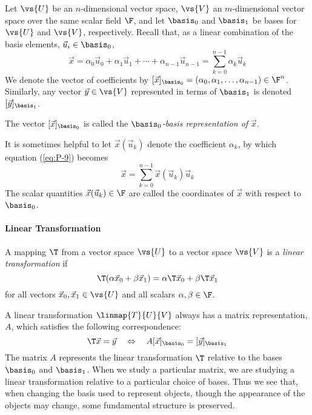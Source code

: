 Let $\vs{U}$ be an $n$-dimensional vector space,
$\vs{V}$ an $m$-dimensional vector space over the same scalar field $\F$, and
let $\basis_0$ and $\basis_1$ be bases for $\vs{U}$ and $\vs{V}$,
respectively. Recall that, %
as a linear combination of the basis elements, $\vec{u}_i \in \basis_0$,
\begin{equation}\label{eq:P-9}
\vec{x} = \alpha_0 \vec{u}_0 + \alpha_1 \vec{u}_1 + \cdots + \alpha_{n-1}\vec{u}_{n-1} =
\sum_{k=0}^{n-1}\alpha_k \vec{u}_k 
\end{equation}
We denote the vector of coefficients by 
$[\vec{x}]_{\basis_0} = (\alpha_0 , \alpha_1 , \ldots ,\alpha_{n-1})\in \F^n$.  
Similarly, any vector $\vec{y} \in \vs{V}$ represented in terms of $\basis_1$ is
denoted $[\vec{y}]_{\basis_1}$. 
\begin{definition}
The vector $[\vec{x}]_{\basis_0}$ is called the
\emph{$\basis_0$-basis representation of $\vec{x}$}.
\end{definition}
It is sometimes helpful to let $\vec{x}(\vec{u}_k)$ denote the coefficient $\alpha_k$,
by which equation (\ref{eq:P-9}) becomes  
\[
\vec{x} %
= \sum_{k=0}^{n-1}\vec{x}(\vec{u}_k)\vec{u}_k
\]
The scalar quantities $\vec{x}(\vec{u}_k)\in \F$ are called
the coordinates of $\vec{x}$ with respect to $\basis_0$.

\paragraph{Linear Transformation}
\begin{definition}
A mapping $\T$ from a vector space $\vs{U}$ to a vector space $\vs{V}$ %
is a {\it linear transformation} %
if 
\begin{equation}\label{eq:P-10}
\T(\alpha \vec{x}_0 + \beta \vec{x}_1) = \alpha \T \vec{x}_0 + \beta \T \vec{x}_1
\end{equation} 
for all vectors $\vec{x}_0, \vec{x}_1 \in \vs{U}$ and all scalars $\alpha, \beta \in \F$.
\end{definition}
A linear transformation $\linmap{T}{U}{V}$ always has a matrix representation,
$A$, which satisfies the following correspondence: 
\[
\T\vec{x} = \vec{y} \quad \Leftrightarrow \quad A[\vec{x}]_{\basis_0}=[\vec{y}]_{\basis_1} 
\]
The matrix $A$ represents the linear transformation $\T$
relative to the bases $\basis_0$ and $\basis_1$.  When we study a
particular matrix, we are studying a linear transformation
relative to a particular choice of bases.  Thus we see that, when
changing the basis used to represent objects, though the appearance
of the objects may change, some fundamental structure is preserved.


